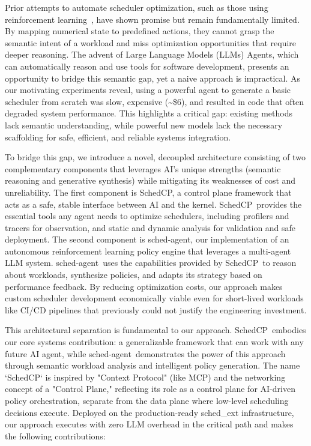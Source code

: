 \documentclass[preprint]{article}
\newcommand{\sys}{SchedCP\xspace}
\newcommand{\agent}{sched-agent\xspace}
\begin{document}
Prior attempts to automate scheduler optimization, such as those using reinforcement learning~\cite{mao2019decima, qiu2020firm}, have shown promise but remain fundamentally limited. By mapping numerical state to predefined actions, they cannot grasp the semantic intent of a workload and miss optimization opportunities that require deeper reasoning. The advent of Large Language Models (LLMs) Agents, which can automatically reason and use tools for software development, presents an opportunity to bridge this semantic gap, yet a naive approach is impractical. As our motivating experiments reveal, using a powerful agent to generate a basic scheduler from scratch was slow, expensive (\textasciitilde\$6), and resulted in code that often degraded system performance. This highlights a critical gap: existing methods lack semantic understanding, while powerful new models lack the necessary scaffolding for safe, efficient, and reliable systems integration.

To bridge this gap, we introduce a novel, decoupled architecture consisting of two complementary components that leverages AI's unique strengths (semantic reasoning and generative synthesis) while mitigating its weaknesses of cost and unreliability. The first component is \sys, a control plane framework that acts as a safe, stable interface between AI and the kernel. \sys\ provides the essential tools any agent needs to optimize schedulers, including profilers and tracers for observation, and static and dynamic analysis for validation and safe deployment. The second component is \agent, our implementation of an autonomous reinforcement learning policy engine that leverages a multi-agent LLM system. \agent\ uses the capabilities provided by \sys\ to reason about workloads, synthesize policies, and adapts its strategy based on performance feedback. By reducing optimization costs, our approach makes custom scheduler development economically viable even for short-lived workloads like CI/CD pipelines that previously could not justify the engineering investment.

This architectural separation is fundamental to our approach. \sys\ embodies our core systems contribution: a generalizable framework that can work with any future AI agent, while \agent\ demonstrates the power of this approach through semantic workload analysis and intelligent policy generation. The name `\sys` is inspired by "Context Protocol" (like MCP) and the networking concept of a "Control Plane," reflecting its role as a control plane for AI-driven policy orchestration, separate from the data plane where low-level scheduling decisions execute. Deployed on the production-ready sched\_ext infrastructure, our approach executes with zero LLM overhead in the critical path and makes the following contributions:
\end{document}
